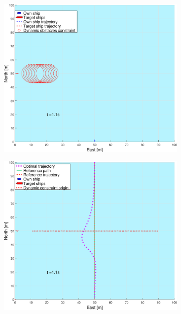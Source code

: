 \begin{figure}[ht!] %
    \begin{subfigure}[b]{0.49\textwidth}
        \centering
        \includegraphics[width=\textwidth]{Images/Figures/enkel_SO/_Simple_1fig1_time=1}
        \subcaption{}
    \end{subfigure}
    \hfill
    \begin{subfigure}[b]{0.499\textwidth}
        \centering
        \includegraphics[width=\textwidth]{Images/Figures/enkel_SO/_Simple_1fig999_time=1}

\end{subfigure}
\end{figure}
